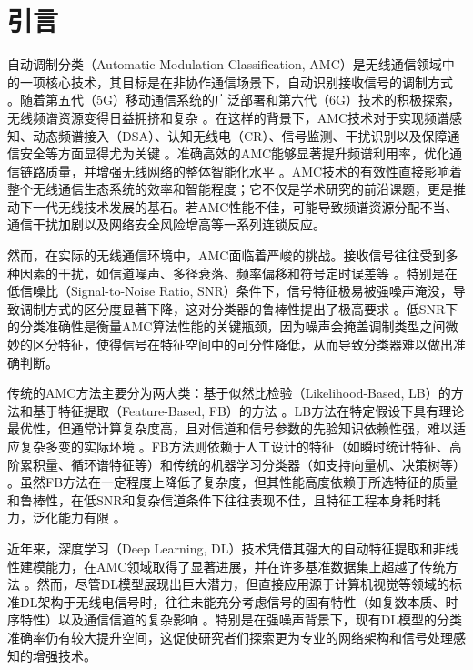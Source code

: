 \documentclass[conference]{IEEEtran}
\begin{document}
\section{引言}
自动调制分类（Automatic Modulation Classification, AMC）是无线通信领域中的一项核心技术，其目标是在非协作通信场景下，自动识别接收信号的调制方式 \cite{[5]}\cite{[6]}。随着第五代（5G）移动通信系统的广泛部署和第六代（6G）技术的积极探索，无线频谱资源变得日益拥挤和复杂 \cite{[12]}\cite{[21]}\cite{[22]}。在这样的背景下，AMC技术对于实现频谱感知、动态频谱接入（DSA）、认知无线电（CR）、信号监测、干扰识别以及保障通信安全等方面显得尤为关键 \cite{[1]}\cite{[5]}\cite{[23]}\cite{[24]}\cite{[25]}。准确高效的AMC能够显著提升频谱利用率，优化通信链路质量，并增强无线网络的整体智能化水平 \cite{[1]}\cite{[6]}。AMC技术的有效性直接影响着整个无线通信生态系统的效率和智能程度；它不仅是学术研究的前沿课题，更是推动下一代无线技术发展的基石。若AMC性能不佳，可能导致频谱资源分配不当、通信干扰加剧以及网络安全风险增高等一系列连锁反应。

然而，在实际的无线通信环境中，AMC面临着严峻的挑战。接收信号往往受到多种因素的干扰，如信道噪声、多径衰落、频率偏移和符号定时误差等 \cite{[5]}\cite{[26]}\cite{[27]}。特别是在低信噪比（Signal-to-Noise Ratio, SNR）条件下，信号特征极易被强噪声淹没，导致调制方式的区分度显著下降，这对分类器的鲁棒性提出了极高要求 \cite{[1]}\cite{[9]}\cite{[28]}\cite{[29]}\cite{[30]}。低SNR下的分类准确性是衡量AMC算法性能的关键瓶颈，因为噪声会掩盖调制类型之间微妙的区分特征，使得信号在特征空间中的可分性降低，从而导致分类器难以做出准确判断。

传统的AMC方法主要分为两大类：基于似然比检验（Likelihood-Based, LB）的方法和基于特征提取（Feature-Based, FB）的方法 \cite{[5]}\cite{[8]}\cite{[10]}。LB方法在特定假设下具有理论最优性，但通常计算复杂度高，且对信道和信号参数的先验知识依赖性强，难以适应复杂多变的实际环境 \cite{[5]}\cite{[8]}\cite{[10]}。FB方法则依赖于人工设计的特征（如瞬时统计特征、高阶累积量、循环谱特征等）和传统的机器学习分类器（如支持向量机、决策树等） \cite{[10]}\cite{[27]}。虽然FB方法在一定程度上降低了复杂度，但其性能高度依赖于所选特征的质量和鲁棒性，在低SNR和复杂信道条件下往往表现不佳，且特征工程本身耗时耗力，泛化能力有限 \cite{[9]}\cite{[10]}\cite{[31]}。

近年来，深度学习（Deep Learning, DL）技术凭借其强大的自动特征提取和非线性建模能力，在AMC领域取得了显著进展，并在许多基准数据集上超越了传统方法 \cite{[10]}\cite{[11]}\cite{[12]}。然而，尽管DL模型展现出巨大潜力，但直接应用源于计算机视觉等领域的标准DL架构于无线电信号时，往往未能充分考虑信号的固有特性（如复数本质、时序特性）以及通信信道的复杂影响 \cite{[5]}\cite{[11]}。特别是在强噪声背景下，现有DL模型的分类准确率仍有较大提升空间，这促使研究者们探索更为专业的网络架构和信号处理感知的增强技术。
\end{document}
